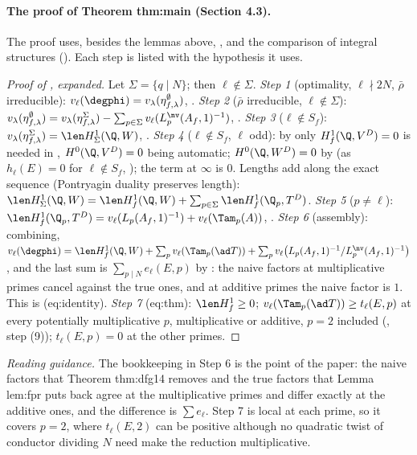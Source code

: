 \begin{sloppypar}
\paragraph{The proof of Theorem thm:main (Section 4.3).} The proof uses, besides the lemmas above, ,
\cite[Theorem 2.2]{ARS12} and the comparison of integral structures (). Each step is listed with the hypothesis it uses.

\begin{proof}[Proof of , expanded]
Let $\Sigma=\{q\mid N\}$; then $\ell\notin\Sigma$.
\emph{Step 1} (optimality, $\ell\nmid2N$, $\bar\rho$ irreducible): $v_\ell(\degphi)=v_\lambda(\eta^\emptyset_{f,\lambda})$, .
\emph{Step 2} ($\bar\rho$ irreducible, $\ell\notin\Sigma$): $v_\lambda(\eta^\emptyset_{f,\lambda})=v_\lambda(\eta^\Sigma_{f,\lambda})-\sum_{p\in\Sigma}v_\ell(L^{\nv}_p(A_f,1)^{-1})$, .
\emph{Step 3} ($\ell\notin S_f$): $v_\lambda(\eta^\Sigma_{f,\lambda})=\len H^1_\Sigma(\Q,W)$, .
\emph{Step 4} ($\ell\notin S_f$, $\ell$ odd): by  only $H^1_f(\Q,V^D)=0$ is needed in , $H^0(\Q,V^D)=0$ being automatic; $H^0(\Q,W^D)=0$ by
 (as $h_\ell(E)=0$ for $\ell\notin S_f$, ); the term at $\infty$ is $0$. Lengths add along the exact sequence (Pontryagin duality preserves length):
$\len H^1_\Sigma(\Q,W)=\len H^1_f(\Q,W)+\sum_{p\in\Sigma}\len H^1_f(\Q_p,T^D)$.
\emph{Step 5} ($p\ne\ell$): $\len H^1_f(\Q_p,T^D)=v_\ell(L_p(A_f,1)^{-1})+v_\ell(\Tam_p(A))$, .
\emph{Step 6} (assembly): combining, $v_\ell(\degphi)=\len H^1_f(\Q,W)+\sum_pv_\ell(\Tam_p(\ad T))+\sum_pv_\ell\bigl(L_p(A_f,1)^{-1}/L^{\nv}_p(A_f,1)^{-1}\bigr)$, and the last sum is $\sum_{p\mid N}e_\ell(E,p)$ by
: the naive factors at multiplicative primes cancel against the true ones, and at additive primes the naive factor is $1$. This is (eq:identity).
\emph{Step 7} (eq:thm): $\len H^1_f\ge0$; $v_\ell(\Tam_p(\ad T))\ge t_\ell(E,p)$ at every potentially multiplicative $p$, multiplicative or additive, $p=2$ included (, step
(9)); $t_\ell(E,p)=0$ at the other primes.
\end{proof}

\noindent\emph{Reading guidance.} The bookkeeping in Step 6 is the point of the paper: the naive factors that Theorem thm:dfg14 removes and the true factors that Lemma lem:fpr puts
back agree at the multiplicative primes and differ exactly at the additive ones, and the difference is $\sum e_\ell$. Step 7 is local at each prime, so it covers $p=2$, where
$t_\ell(E,2)$ can be positive although no quadratic twist of conductor dividing $N$ need make the reduction multiplicative.


\end{sloppypar}
